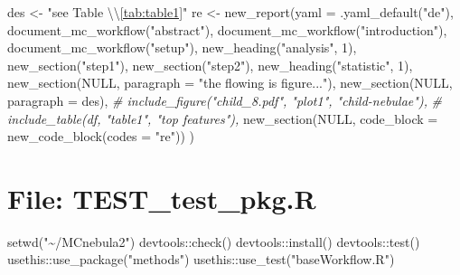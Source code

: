 \documentclass[
]{article}
\newenvironment{Shaded}{\begin{snugshade}}{\end{snugshade}}
\newcommand{\AttributeTok}[1]{\textcolor[rgb]{0.77,0.63,0.00}{#1}}
\newcommand{\CommentTok}[1]{\textcolor[rgb]{0.56,0.35,0.01}{\textit{#1}}}
\newcommand{\ConstantTok}[1]{\textcolor[rgb]{0.00,0.00,0.00}{#1}}
\newcommand{\DecValTok}[1]{\textcolor[rgb]{0.00,0.00,0.81}{#1}}
\newcommand{\FunctionTok}[1]{\textcolor[rgb]{0.00,0.00,0.00}{#1}}
\newcommand{\NormalTok}[1]{#1}
\newcommand{\OtherTok}[1]{\textcolor[rgb]{0.56,0.35,0.01}{#1}}
\newcommand{\SpecialCharTok}[1]{\textcolor[rgb]{0.00,0.00,0.00}{#1}}
\newcommand{\StringTok}[1]{\textcolor[rgb]{0.31,0.60,0.02}{#1}}
\begin{document}
\begin{Shaded}
\begin{Highlighting}[]
\NormalTok{des }\OtherTok{\textless{}{-}} \StringTok{"see Table }\SpecialCharTok{\textbackslash{}\textbackslash{}}\StringTok{\ref{tab:table1}"}
\NormalTok{re }\OtherTok{\textless{}{-}} \FunctionTok{new\_report}\NormalTok{(}\AttributeTok{yaml =} \FunctionTok{.yaml\_default}\NormalTok{(}\StringTok{"de"}\NormalTok{),}
                 \FunctionTok{document\_mc\_workflow}\NormalTok{(}\StringTok{"abstract"}\NormalTok{),}
                 \FunctionTok{document\_mc\_workflow}\NormalTok{(}\StringTok{"introduction"}\NormalTok{),}
                 \FunctionTok{document\_mc\_workflow}\NormalTok{(}\StringTok{"setup"}\NormalTok{),}
                 \FunctionTok{new\_heading}\NormalTok{(}\StringTok{"analysis"}\NormalTok{, }\DecValTok{1}\NormalTok{),}
                 \FunctionTok{new\_section}\NormalTok{(}\StringTok{"step1"}\NormalTok{),}
                 \FunctionTok{new\_section}\NormalTok{(}\StringTok{"step2"}\NormalTok{),}
                 \FunctionTok{new\_heading}\NormalTok{(}\StringTok{"statistic"}\NormalTok{, }\DecValTok{1}\NormalTok{),}
                 \FunctionTok{new\_section}\NormalTok{(}\ConstantTok{NULL}\NormalTok{, }\AttributeTok{paragraph =} \StringTok{"the flowing is figure..."}\NormalTok{),}
                 \FunctionTok{new\_section}\NormalTok{(}\ConstantTok{NULL}\NormalTok{, }\AttributeTok{paragraph =}\NormalTok{ des),}
                 \CommentTok{\# include\_figure("child\_8.pdf", "plot1", "child{-}nebulae"),}
                 \CommentTok{\# include\_table(df, "table1", "top features"),}
                 \FunctionTok{new\_section}\NormalTok{(}\ConstantTok{NULL}\NormalTok{, }\AttributeTok{code\_block =}
                             \FunctionTok{new\_code\_block}\NormalTok{(}\AttributeTok{codes =} \StringTok{"re"}\NormalTok{))}
\NormalTok{)}
\end{Highlighting}
\end{Shaded}

\hypertarget{file-test_test_pkg.r}{%
\section{File: TEST\_test\_pkg.R}\label{file-test_test_pkg.r}}

\begin{Shaded}
\begin{Highlighting}[]
\FunctionTok{setwd}\NormalTok{(}\StringTok{"\textasciitilde{}/MCnebula2"}\NormalTok{)}
\NormalTok{devtools}\SpecialCharTok{::}\FunctionTok{check}\NormalTok{()}
\NormalTok{devtools}\SpecialCharTok{::}\FunctionTok{install}\NormalTok{()}
\NormalTok{devtools}\SpecialCharTok{::}\FunctionTok{test}\NormalTok{()}
\NormalTok{usethis}\SpecialCharTok{::}\FunctionTok{use\_package}\NormalTok{(}\StringTok{"methods"}\NormalTok{)}
\NormalTok{usethis}\SpecialCharTok{::}\FunctionTok{use\_test}\NormalTok{(}\StringTok{"baseWorkflow.R"}\NormalTok{)}
\end{Highlighting}
\end{Shaded}
\end{document}
